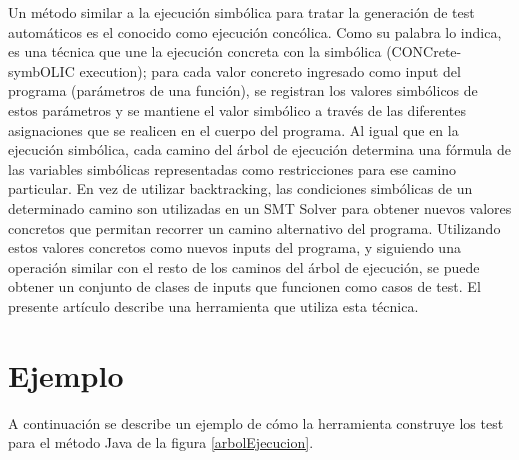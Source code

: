 \documentclass{llncs}
\begin{document}
Un método similar a la ejecución simbólica para tratar la generación de test automáticos es el conocido como ejecución concólica. Como su palabra lo indica, es una técnica que une la
ejecución concreta con la simbólica (CONCrete-symbOLIC execution); para cada valor concreto ingresado como input del programa (parámetros de una función), se registran los valores
simbólicos de estos parámetros y se mantiene el valor simbólico a través de las diferentes asignaciones que se realicen en el cuerpo del programa. Al igual que en la ejecución
simbólica, cada camino del árbol de ejecución determina una fórmula de las variables simbólicas representadas como restricciones para ese camino particular. En vez de utilizar backtracking,
las condiciones simbólicas de un determinado camino son utilizadas en un SMT Solver para obtener nuevos valores concretos que permitan recorrer un camino alternativo del programa.
Utilizando estos valores concretos como nuevos inputs del programa, y siguiendo una operación similar con el resto de los caminos del árbol de ejecución, se puede obtener un conjunto
de clases de inputs que funcionen como casos de test. El presente artículo describe una herramienta que utiliza esta técnica.


\section{Ejemplo}
A continuación se describe un ejemplo de cómo la herramienta construye los test para el método Java de la figura \ref{arbolEjecucion}.
\end{document}
